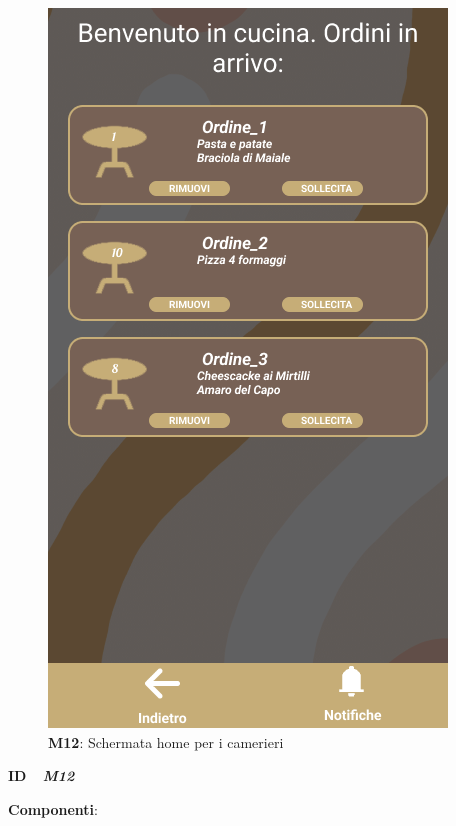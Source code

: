           \begin{figure}[H]
            \centering
            \includegraphics[scale=0.5]{assets/diagrammi/Mockup/Mockup_OrderStatus.png}
            \caption*{\textbf{M12}: Schermata home per i camerieri}
            \label{fig:Mockup_WaiterDash}
          \end{figure}

            \begin{flushleft}
              \textbf{ID}   \ \Large{ \emph{\textbf{M12}}}
            \end{flushleft}
  
            \textbf{Componenti}:
            
